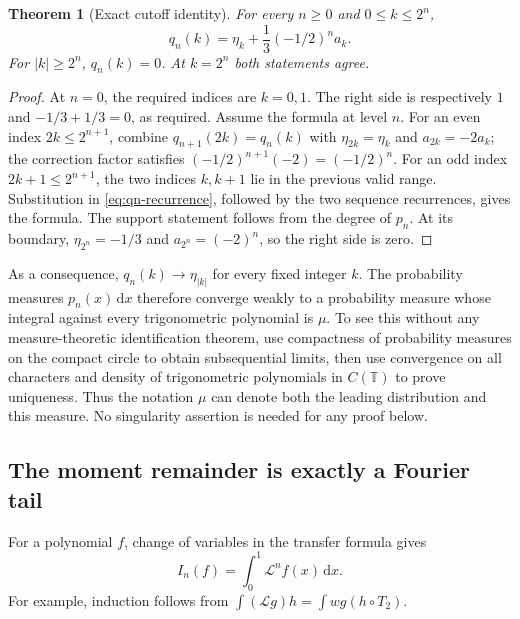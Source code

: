 \documentclass[11pt,a4paper]{article}
\newtheorem{theorem}{Theorem}[section]
\theoremstyle{definition}
\theoremstyle{remark}
\newcommand{\T}{\mathbb T}
\newcommand{\dd}{\,\mathrm d}
\newcommand{\Lop}{\mathcal L}
\numberwithin{equation}{section}
\begin{document}
\begin{theorem}[Exact cutoff identity]
\label{thm:cutoff}
For every $n\ge0$ and $0\le k\le2^n$,
\begin{equation}
 q_n(k)=\eta_k+\frac13(-1/2)^na_k.
 \label{eq:cutoff}
\end{equation}
For $|k|\ge2^n$, $q_n(k)=0$. At $k=2^n$ both statements agree.
\end{theorem}
\begin{proof}
At $n=0$, the required indices are $k=0,1$. The right side is respectively
$1$ and $-1/3+1/3=0$, as required. Assume the formula at level $n$.
For an even index $2k\le2^{n+1}$, combine
$q_{n+1}(2k)=q_n(k)$ with $\eta_{2k}=\eta_k$ and $a_{2k}=-2a_k$;
the correction factor satisfies
$(-1/2)^{n+1}(-2)=(-1/2)^n$.
For an odd index $2k+1\le2^{n+1}$, the two indices $k,k+1$ lie in the
previous valid range. Substitution in \eqref{eq:qn-recurrence}, followed
by the two sequence recurrences, gives the formula.
The support statement follows from the degree of $p_n$. At its boundary,
$\eta_{2^n}=-1/3$ and $a_{2^n}=(-2)^n$, so the right side is zero.
\end{proof}

As a consequence, $q_n(k)\to\eta_{|k|}$ for every fixed integer $k$.
The probability measures $p_n(x)\dd x$ therefore converge weakly to a
probability measure whose integral against every trigonometric polynomial
is $\mu$. To see this without any measure-theoretic identification theorem,
use compactness of probability measures on the compact circle to obtain
subsequential limits, then use convergence on all characters and density of
trigonometric polynomials in $C(\T)$ to prove uniqueness. Thus the notation
$\mu$ can denote both the leading distribution and this measure.
No singularity assertion is needed for any proof below.

\subsection{The moment remainder is exactly a Fourier tail}
For a polynomial $f$, change of variables in the transfer formula gives
\begin{equation}
 I_n(f)=\int_0^1\Lop^nf(x)\dd x.
 \label{eq:transfer-moment}
\end{equation}
For example, induction follows from
$\int (\Lop g)h=\int wg(h\circ T_2)$.
\end{document}
